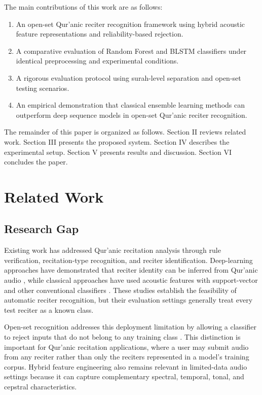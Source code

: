 \documentclass[conference]{IEEEtran}
\begin{document}
The main contributions of this work are as follows:

\begin{enumerate}
\item An open-set Qur'anic reciter recognition framework using hybrid acoustic feature representations and reliability-based rejection.
\item A comparative evaluation of Random Forest and BLSTM classifiers under identical preprocessing and experimental conditions.
\item A rigorous evaluation protocol using surah-level separation and open-set testing scenarios.
\item An empirical demonstration that classical ensemble learning methods can outperform deep sequence models in open-set Qur'anic reciter recognition.
\end{enumerate}

The remainder of this paper is organized as follows. Section II reviews related work. Section III presents the proposed system. Section IV describes the experimental setup. Section V presents results and discussion. Section VI concludes the paper.

\section{Related Work}

\subsection{Research Gap}

Existing work has addressed Qur'anic recitation analysis through rule verification, recitation-type recognition, and reciter identification. Deep-learning approaches have demonstrated that reciter identity can be inferred from Qur'anic audio \cite{ref1,ref6,ref7}, while classical approaches have used acoustic features with support-vector and other conventional classifiers \cite{ref3,ref4}. These studies establish the feasibility of automatic reciter recognition, but their evaluation settings generally treat every test reciter as a known class.

Open-set recognition addresses this deployment limitation by allowing a classifier to reject inputs that do not belong to any training class \cite{openset}. This distinction is important for Qur'anic recitation applications, where a user may submit audio from any reciter rather than only the reciters represented in a model's training corpus. Hybrid feature engineering also remains relevant in limited-data audio settings because it can capture complementary spectral, temporal, tonal, and cepstral characteristics.
\end{document}
